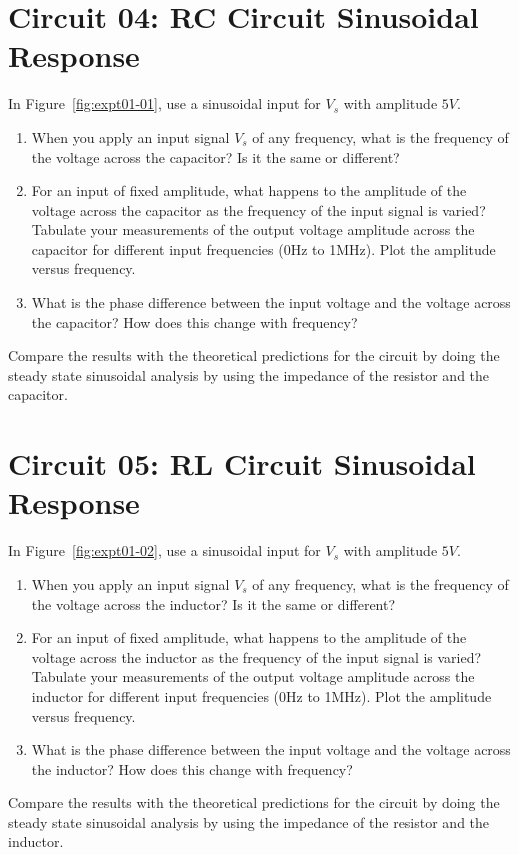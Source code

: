 \section{Circuit 04: RC Circuit Sinusoidal Response}
In Figure~\ref{fig:expt01-01}, use a sinusoidal input for $V_s$ with amplitude $5V$. 
\begin{enumerate}
    \item When you apply an input signal $V_s$ of any frequency, what is the frequency of the voltage across the capacitor? Is it the same or different?
    \item For an input of fixed amplitude, what happens to the amplitude of the voltage across the capacitor as the frequency of the input signal is varied? Tabulate your measurements of the output voltage amplitude across the capacitor for different input frequencies (0Hz to 1MHz). Plot the amplitude versus frequency.
    \item What is the phase difference between the input voltage and the voltage across the capacitor? How does this change with frequency?
\end{enumerate}
Compare the results with the theoretical predictions for the circuit by doing the steady state sinusoidal analysis by using the impedance of the resistor and the capacitor.

\section{Circuit 05: RL Circuit Sinusoidal Response}
In Figure~\ref{fig:expt01-02}, use a sinusoidal input for $V_s$ with amplitude $5V$. 
\begin{enumerate}
    \item When you apply an input signal $V_s$ of any frequency, what is the frequency of the voltage across the inductor? Is it the same or different?
    \item For an input of fixed amplitude, what happens to the amplitude of the voltage across the inductor as the frequency of the input signal is varied? Tabulate your measurements of the output voltage amplitude across the inductor for different input frequencies (0Hz to 1MHz). Plot the amplitude versus frequency.
    \item What is the phase difference between the input voltage and the voltage across the inductor? How does this change with frequency?
\end{enumerate}
Compare the results with the theoretical predictions for the circuit by doing the steady state sinusoidal analysis by using the impedance of the resistor and the inductor.

